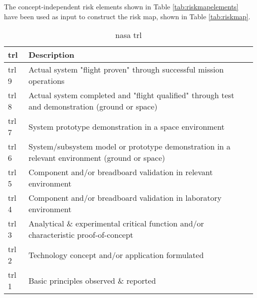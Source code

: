 The concept-independent risk elements shown in Table \ref{tab:riskmapelements} have been used as input to construct the risk map, shown in Table \ref{tab:riskmap}.

\begin{table}[h]
	\caption[\acrfull{nasa} ]{\acrfull{nasa} \acrfull{trl} \cite{NASA2007}}
	\begin{tabular}{|p{}|p{}|}
		\hline
		\textbf{\acrfull{trl}} & \textbf{Description} \\ \hline \hline
		\gls{trl} 9& Actual system "flight proven" through successful mission operations\\
		\gls{trl} 8& Actual system completed and "flight qualified" through test and demonstration (ground or space)\\
		\gls{trl} 7& System prototype demonstration in a space environment\\
		\gls{trl} 6& System/subsystem model or prototype demonstration in a relevant environment (ground or space)\\
		\gls{trl} 5& Component and/or breadboard validation in relevant environment\\
		\gls{trl} 4& Component and/or breadboard validation in laboratory environment\\
		\gls{trl} 3& Analytical \& experimental critical function and/or characteristic proof-of-concept\\
		\gls{trl} 2& Technology concept and/or application formulated\\
		\gls{trl} 1& Basic principles observed \& reported \\
		\hline
	\end{tabular}
	\label{tab:trls}
\end{table}

